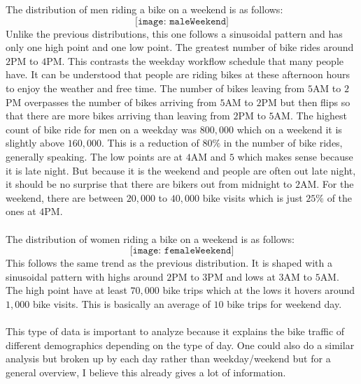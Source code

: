 \documentclass{article}
\begin{document}
The distribution of men riding a bike on a weekend is as follows: 
$$ \texttt{[image: maleWeekend]} $$ 
Unlike the previous distributions, this one follows a sinusoidal pattern and has only one high point and one low point. The greatest number of bike rides around $2$PM to $4$PM. This contrasts the weekday workflow schedule that many people have. It can be understood that people are riding bikes at these afternoon hours to enjoy the weather and free time. The number of bikes leaving from $5$AM to $2$PM overpasses the number of bikes arriving from $5$AM to $2$PM but then flips so that there are more bikes arriving than leaving from $2$PM to $5$AM. The highest count of bike ride for men on a weekday was $800,000$ which on a weekend it is slightly above $160,000$. This is a reduction of $80\%$ in the number of bike rides, generally speaking. The low points are at $4$AM and $5$ which makes sense because it is late night. But because it is the weekend and people are often out late night, it should be no surprise that there are bikers out from midnight to $2$AM. For the weekend, there are between $20,000$ to $40,000$ bike visits which is just $25\%$ of the ones at $4$PM. \\~\\

The distribution of women riding a bike on a weekend is as follows: 
$$ \texttt{[image: femaleWeekend]} $$ 
This follows the same trend as the previous distribution. It is shaped with a sinusoidal pattern with highs around $2$PM to $3$PM and lows at $3$AM to $5$AM. The high point have at least $70,000$ bike trips which at the lows it hovers around $1,000$ bike visits. This is basically an average of $10$ bike trips for weekend day. \\~\\

This type of data is important to analyze because it explains the bike traffic of different demographics depending on the type of day. One could also do a similar analysis but broken up by each day rather than weekday/weekend but for a general overview, I believe this already gives a lot of information. 
\newpage
\end{document}
